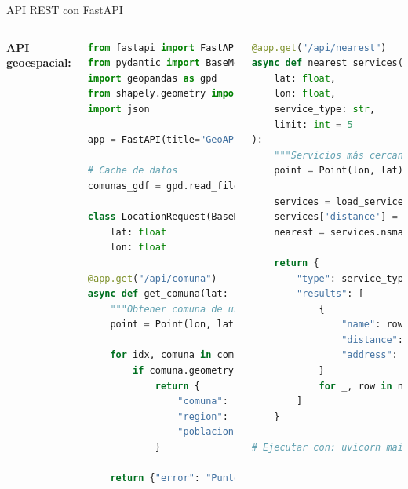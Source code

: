 \documentclass[10pt,aspectratio=169]{beamer}
\begin{document}
\begin{frame}[fragile]{API REST con FastAPI}
    \begin{columns}[T]
        \textbf{API geoespacial:}
        \begin{lstlisting}[language=Python]
from fastapi import FastAPI, Query
from pydantic import BaseModel
import geopandas as gpd
from shapely.geometry import Point
import json

app = FastAPI(title="GeoAPI")

# Cache de datos
comunas_gdf = gpd.read_file("comunas.gpkg")

class LocationRequest(BaseModel):
    lat: float
    lon: float

@app.get("/api/comuna")
async def get_comuna(lat: float, lon: float):
    """Obtener comuna de un punto"""
    point = Point(lon, lat)
    
    for idx, comuna in comunas_gdf.iterrows():
        if comuna.geometry.contains(point):
            return {
                "comuna": comuna['nombre'],
                "region": comuna['region'],
                "poblacion": int(comuna['poblacion'])
            }
    
    return {"error": "Punto fuera de Chile"}
        \end{lstlisting}
        
        \begin{lstlisting}[language=Python]
@app.get("/api/nearest")
async def nearest_services(
    lat: float, 
    lon: float, 
    service_type: str,
    limit: int = 5
):
    """Servicios más cercanos"""
    point = Point(lon, lat)
    
    services = load_services(service_type)
    services['distance'] = services.distance(point)
    nearest = services.nsmallest(limit, 'distance')
    
    return {
        "type": service_type,
        "results": [
            {
                "name": row['name'],
                "distance": round(row['distance'], 2),
                "address": row['address']
            } 
            for _, row in nearest.iterrows()
        ]
    }

# Ejecutar con: uvicorn main:app --reload
        \end{lstlisting}
    \end{columns}
\end{frame}
\end{document}
